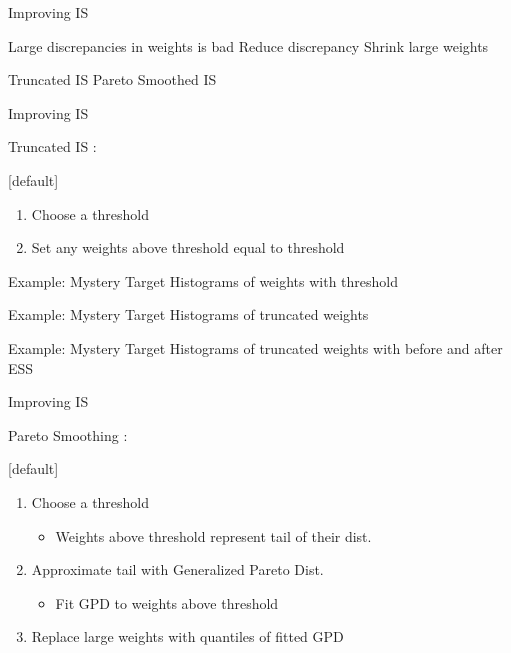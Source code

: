\documentclass[14pt]{beamer}
\begin{document}
\begin{frame}{Improving IS}
    \begin{outline}
        \1 Large discrepancies in weights is bad
            \2 Reduce discrepancy
            \2 Shrink large weights \newline
        
        \1 Truncated IS
        \1 Pareto Smoothed IS
    \end{outline}
\end{frame}

\begin{frame}{Improving IS}
    \begin{outline}
        \1 Truncated IS \citep{Ion08}: \newline
    \end{outline}

    [default]
    \begin{enumerate}
        \item Choose a threshold
        \item Set any weights above threshold equal to threshold
    \end{enumerate}
\end{frame}

\begin{frame}{Example: Mystery Target}
    Histograms of weights with threshold
\end{frame}

\begin{frame}{Example: Mystery Target}
    Histograms of truncated weights
\end{frame}

\begin{frame}{Example: Mystery Target}
    Histograms of truncated weights with before and after ESS
\end{frame}



\begin{frame}{Improving IS}
    \begin{outline}
    \1 Pareto Smoothing \citep{Veh22}:\newline
    \end{outline}

    [default]
    \begin{enumerate}
    \item Choose a threshold
        \begin{itemize}
            \item Weights above threshold represent tail of their dist.
        \end{itemize}
    \item Approximate tail with Generalized Pareto Dist.
    \begin{itemize}
        \item Fit GPD to weights above threshold
    \end{itemize}
    \item Replace large weights with quantiles of fitted GPD
    \end{enumerate}
\end{frame}
\end{document}

